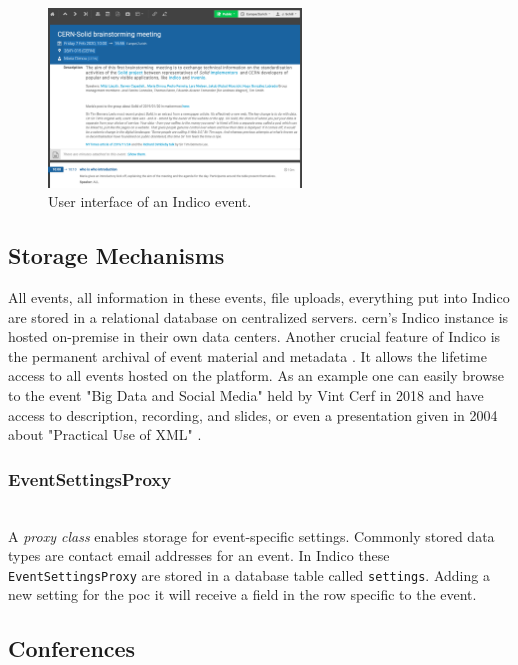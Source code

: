 \begin{figure}[H]
    \centering
    \includegraphics[width=0.6\textwidth]{thesis/latex/assets/indico-event-interface.png}
    \caption{User interface of an Indico event.}
    \label{fig:indico-event-interface}
\end{figure} 

\subsection{Storage Mechanisms}

All events, all information in these events, file uploads, everything put into Indico are stored in a relational database on centralized servers. \gls{cern}'s Indico instance is hosted on-premise in their own data centers. Another crucial feature of Indico is the permanent archival of event material and metadata \cite{cern-indico}. It allows the lifetime access to all events hosted on the platform. As an example one can easily browse to the event "Big Data and Social Media" held by Vint Cerf in 2018 \cite{vint-cerf} and have access to description, recording, and slides, or even a presentation given in 2004 about "Practical Use of XML" \cite{titov}.

\subsubsection{EventSettingsProxy}\mbox{}\\

A \textit{proxy class} enables storage for event-specific settings. Commonly stored data types are contact email addresses for an event. In Indico these \texttt{EventSettingsProxy} are stored in a database table called \texttt{settings}. Adding a new setting for the \gls{poc} it will receive a field in the row specific to the event.

\subsection{Conferences}

